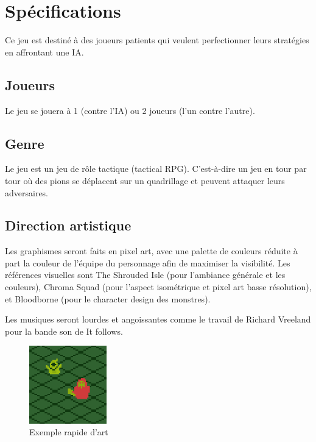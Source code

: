\documentclass[a4paper]{scrreprt}
\begin{document}

\chapter{Spécifications}
Ce jeu est destiné à des joueurs patients qui veulent perfectionner leurs stratégies en affrontant une IA.

\section{Joueurs}

Le jeu se jouera à 1 (contre l'IA) ou 2 joueurs (l'un contre l'autre).

\section{Genre}
Le jeu est un jeu de rôle tactique (tactical RPG). C'est-à-dire un jeu en tour par tour où des pions se déplacent sur un quadrillage et peuvent attaquer leurs adversaires.

\section{Direction artistique}
Les graphismes seront faits en pixel art, avec une palette de couleurs réduite à part la couleur de l'équipe du personnage afin de maximiser la visibilité.
Les références visuelles sont The Shrouded Isle (pour l'ambiance générale et les couleurs), Chroma Squad (pour l'aspect isométrique et pixel art basse résolution), et Bloodborne (pour le character design des monstres).

Les musiques seront lourdes et angoissantes comme le travail de Richard Vreeland pour la bande son de It follows.

\begin{figure}
\centering
\includegraphics[width=0.3\textwidth]{example.png}
\caption{\label{fig:art} Exemple rapide d'art}
\end{figure}
\end{document}
